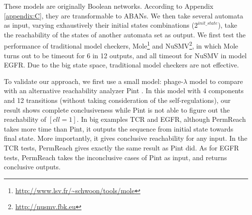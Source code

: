 \documentclass[runningheads]{llncs}
\begin{document}
These models are originally Boolean networks.
According to Appendix \ref{appendix:C}, they are transformable to ABANs. We then take several automata as input, varying exhaustively their initial states combinations ($2^{init\_state}$), take the reachability of the states of another automata set as output.
We first test the performance of traditional model checkers, Mole\footnote{\url{http://www.lsv.fr/~schwoon/tools/mole}} and NuSMV\footnote{\url{http://nusmv.fbk.eu}}, in which Mole turns out to be timeout for 6 in 12 outputs, and all timeout for NuSMV in model EGFR.
Due to the big state space, traditional model checkers are not effective. 

To validate our approach, we first use a small model: phage-$\lambda$ model \cite{thieffry1995dynamical} to compare with an alternative reachability analyzer Pint \cite{pauleve2012}. In this model with 4 components and 12 transitions (without taking consideration of the self-regulations), our result shows complete conclusiveness while Pint is not able to figure out the reachability of $[cll=1]$. 
In big examples TCR and EGFR,
although PermReach takes more time than Pint, it outputs the sequence from initial state towards final state.
More importantly, it gives conclusive reachability for any input. 
In the TCR tests, PermReach gives exactly the same result as Pint did. As for EGFR tests, PermReach takes the inconclusive cases of Pint as input, and returns conclusive outputs.

\end{document}
